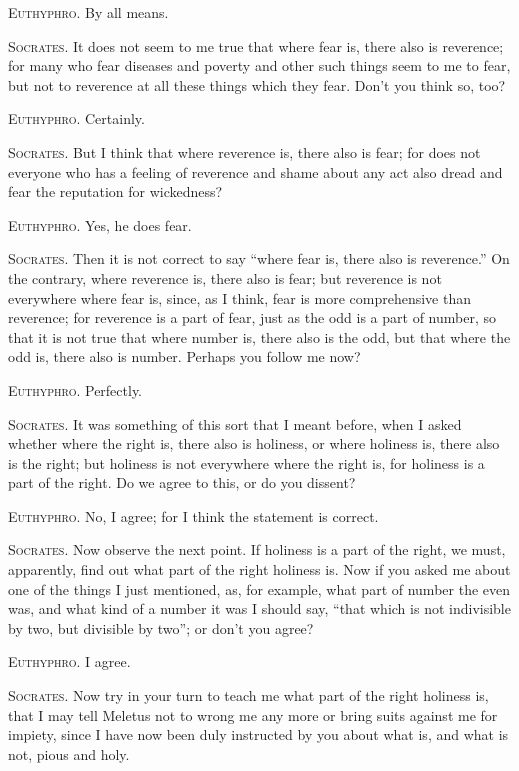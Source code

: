 \textsc{Euthyphro}. By all means.

\textsc{Socrates}. It does not seem to me true that where fear is,
there also is reverence; for many who fear diseases and poverty and
other such things seem to me to fear, but not to reverence at all
these things which they fear. Don't you think so, too?

\textsc{Euthyphro}. Certainly.

\textsc{Socrates}. But I think that where reverence is, there also is
fear; for does not everyone who has a feeling of reverence and shame
about any act also dread and fear the reputation for wickedness?

\textsc{Euthyphro}. Yes, he does fear.

\textsc{Socrates}. Then it is not correct to say ``where fear is,
there also is reverence.'' On the contrary, where reverence is, there
also is fear; but reverence is not everywhere where fear is, since, as
I think, fear is more comprehensive than reverence; for reverence is a
part of fear, just as the odd is a part of number, so that it is not
true that where number is, there also is the odd, but that where the
odd is, there also is number. Perhaps you follow me now?

\textsc{Euthyphro}. Perfectly.

\textsc{Socrates}. It was something of this sort that I meant before,
when I asked whether where the right is, there also is holiness, or
where holiness is,  there also is the right; but holiness is
not everywhere where the right is, for holiness is a part of the
right. Do we agree to this, or do you dissent?

\textsc{Euthyphro}. No, I agree; for I think the statement is correct.

\textsc{Socrates}. Now observe the next point. If holiness is a part
of the right, we must, apparently, find out what part of the right
holiness is. Now if you asked me about one of the things I just
mentioned, as, for example, what part of number the even was, and what
kind of a number it was I should say, ``that which is not indivisible
by two, but divisible by two''; or don't you agree?

\textsc{Euthyphro}. I agree.

\textsc{Socrates}. Now try in your turn to teach me what part of the
right holiness is, that I may tell Meletus not to wrong me any more or
bring suits against me for impiety, since I have now been duly
instructed by you about what is, and what is not, pious and holy.

